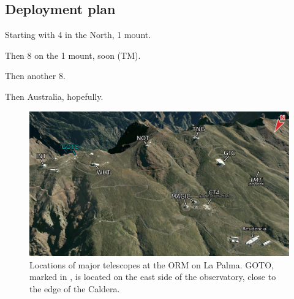 \begin{colsection}

\newpage
\subsection{Deployment plan}
\label{sec:goto_expansion}
\begin{colsection}


Starting with 4 in the North, 1 mount.

Then 8 on the 1 mount, soon (TM).

Then another 8.

Then Australia, hopefully.

\newpage

\begin{figure}[p]
    \begin{center}
        \includegraphics[width=\linewidth]{images/orm_labelled.png}
    \end{center}
    \caption[Locations of major telescopes on La Palma]{
        Locations of major telescopes at the ORM on La Palma. GOTO, marked in , is located on the east side of the observatory, close to the edge of the Caldera.
    }\label{fig:orm}
\end{figure}


\end{colsection}
\end{colsection}
